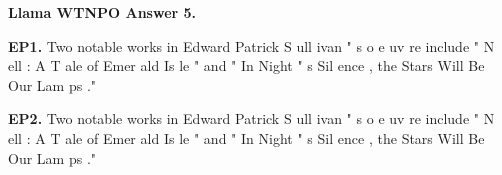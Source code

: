 \clearpage
\begin{mdframed}\small
\textbf{Llama WTNPO Answer 5.}

\textbf{EP1.} \textcolor{Gray3}{Two} \textcolor{Gray5}{notable} \textcolor{Gray8}{works} \textcolor{Gray9}{in} \textcolor{Gray9}{Edward} \textcolor{Gray9}{Patrick} \textcolor{Gray9}{S} \textcolor{Gray9}{ull} \textcolor{Gray9}{ivan} \textcolor{Gray8}{"} \textcolor{Gray5}{s} \textcolor{Gray6}{o} \textcolor{Gray9}{e} \textcolor{Gray7}{uv} \textcolor{Gray9}{re} \textcolor{Gray9}{include} \textcolor{Gray8}{"} \textcolor{Gray7}{N} \textcolor{Gray9}{ell} \textcolor{Gray8}{:} \textcolor{Gray9}{A} \textcolor{Gray7}{T} \textcolor{Gray9}{ale} \textcolor{Gray9}{of} \textcolor{Gray6}{Emer} \textcolor{Gray9}{ald} \textcolor{Gray8}{Is} \textcolor{Gray9}{le} \textcolor{Gray9}{"} \textcolor{Gray9}{and} \textcolor{Gray9}{"} \textcolor{Gray9}{In} \textcolor{Gray9}{Night} \textcolor{Gray8}{"} \textcolor{Gray9}{s} \textcolor{Gray9}{Sil} \textcolor{Gray8}{ence} \textcolor{Gray9}{,} \textcolor{Gray9}{the} \textcolor{Gray7}{Stars} \textcolor{Gray9}{Will} \textcolor{Gray9}{Be} \textcolor{Gray8}{Our} \textcolor{Gray9}{Lam} \textcolor{Gray9}{ps} \textcolor{Gray7}{."} 

\textbf{EP2.} \textcolor{Gray0}{Two} \textcolor{Gray0}{notable} \textcolor{Gray2}{works} \textcolor{Gray2}{in} \textcolor{Gray1}{Edward} \textcolor{Gray3}{Patrick} \textcolor{Gray5}{S} \textcolor{Gray8}{ull} \textcolor{Gray4}{ivan} \textcolor{Gray2}{"} \textcolor{Gray0}{s} \textcolor{Gray0}{o} \textcolor{Gray3}{e} \textcolor{Gray5}{uv} \textcolor{Gray8}{re} \textcolor{Gray2}{include} \textcolor{Gray0}{"} \textcolor{Gray1}{N} \textcolor{Gray9}{ell} \textcolor{Gray1}{:} \textcolor{Gray2}{A} \textcolor{Gray0}{T} \textcolor{Gray3}{ale} \textcolor{Gray1}{of} \textcolor{Gray1}{Emer} \textcolor{Gray8}{ald} \textcolor{Gray1}{Is} \textcolor{Gray9}{le} \textcolor{Gray2}{"} \textcolor{Gray4}{and} \textcolor{Gray2}{"} \textcolor{Gray0}{In} \textcolor{Gray8}{Night} \textcolor{Gray1}{"} \textcolor{Gray7}{s} \textcolor{Gray8}{Sil} \textcolor{Gray8}{ence} \textcolor{Gray4}{,} \textcolor{Gray6}{the} \textcolor{Gray7}{Stars} \textcolor{Gray8}{Will} \textcolor{Gray7}{Be} \textcolor{Gray3}{Our} \textcolor{Gray9}{Lam} \textcolor{Gray8}{ps} \textcolor{Gray3}{."} 


\end{mdframed}
